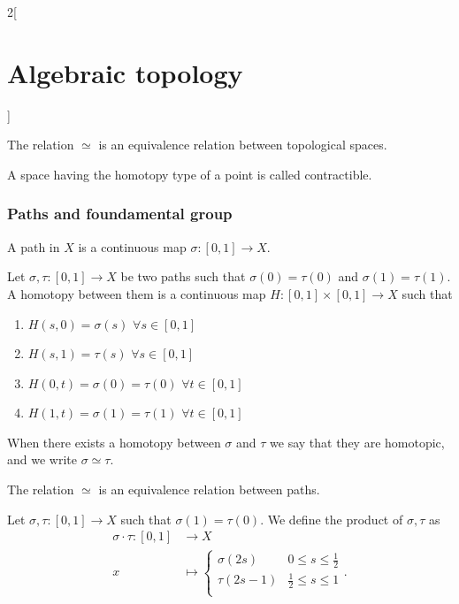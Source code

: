 \documentclass[../../../main_math.tex]{subfiles}
\begin{document}
\begin{multicols}{2}[\section{Algebraic topology}]
  \begin{proposition}
    The relation $\simeq$ is an equivalence relation between topological spaces.
  \end{proposition}

  \begin{definition}
    A space having the homotopy type of a point is called contractible.
  \end{definition}

  \subsubsection{Paths and foundamental group}

  \begin{definition}
    A path in $X$ is a continuous map $\sigma:[0,1]\to X$.
  \end{definition}

  \begin{definition}
    Let $\sigma, \tau : [0,1]\to X$ be two paths such that $\sigma(0)=\tau(0)$ and $\sigma(1)=\tau(1)$. A homotopy between them is a continuous map $H:[0,1]\times [0,1] \to X$ such that
    \begin{enumerate}
      \item $H(s,0)=\sigma(s) $ $\forall s\in [0,1]$
      \item $H(s,1)=\tau(s)$ $\forall s\in [0,1]$
      \item $H(0,t)=\sigma(0)=\tau(0)$ $\forall t\in [0,1]$
      \item $H(1,t)=\sigma(1)=\tau(1)$ $\forall t\in [0,1]$
    \end{enumerate}
    When there exists a homotopy between $\sigma$ and $\tau$ we say that they are homotopic, and we write $\sigma \simeq \tau $.
  \end{definition}

  \begin{proposition}
    The relation $\simeq$ is an equivalence relation between paths.
  \end{proposition}

  \begin{definition}
    Let $\sigma, \tau: [0,1] \to X$ such that $\sigma(1)=\tau(0)$. We define the product of $\sigma, \tau$ as
    \begin{align*}
      \sigma \cdot \tau: [0,1] & \longrightarrow X                                 \\
      x                        & \longmapsto \begin{cases}
                                               \sigma(2s) & 0\leq s \leq \frac{1}{2} \\
                                               \tau(2s-1) & \frac{1}{2}\leq s \leq 1 \\
                                             \end{cases}.
    \end{align*}


\end{definition}
\end{multicols}
\end{document}
